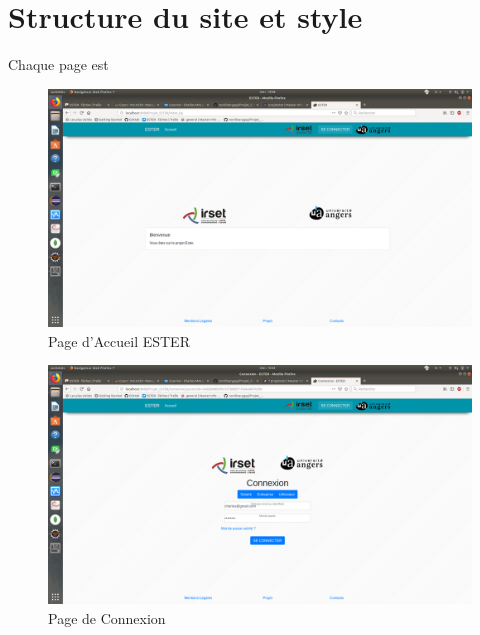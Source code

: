 \section{Structure du site et style}

Chaque page est 

\begin{figure}[H]
    \begin{center}
	\includegraphics[scale=0.2,trim=4cm 0cm 4cm 5.3cm, clip=true]{img/ESTER}
    \end{center}
    \caption{Page d'Accueil ESTER}
\end{figure}

\begin{figure}[H]
    \begin{center}
	\includegraphics[scale=0.2,trim=4cm 0cm 4cm 5.3cm, clip=true]{img/Connexion}
    \end{center}
    \caption{Page de Connexion}
\end{figure}